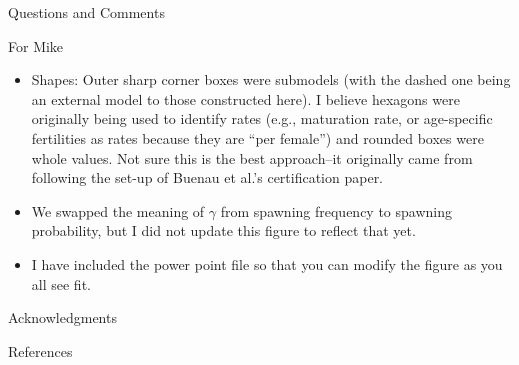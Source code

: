 \documentclass[12pt]{article}
\begin{document}
\begin{section}{Questions and Comments}
\begin{subsection}{For Mike}
\begin{enumerate}
\begin{itemize}
	\item Shapes: Outer sharp corner boxes were submodels (with the dashed one being an external model to those constructed here).  I believe hexagons were originally being used to identify rates (e.g., maturation rate, or age-specific fertilities as rates because they are ``per female'') and rounded boxes were whole values.  Not sure this is the best approach--it originally came from following the set-up of Buenau et al.'s certification paper.
	\item We swapped the meaning of $\gamma$ from spawning frequency to spawning probability, but I did not update this figure to reflect that yet.
	\item I have included the power point file so that you can modify the figure as you all see fit. 
	\end{itemize} 
\end{enumerate}
\end{subsection}
\end{section}


\begin{section}{Acknowledgments}
\end{section}

\begin{section}{References}
\end{section}

\newpage
\end{document}
